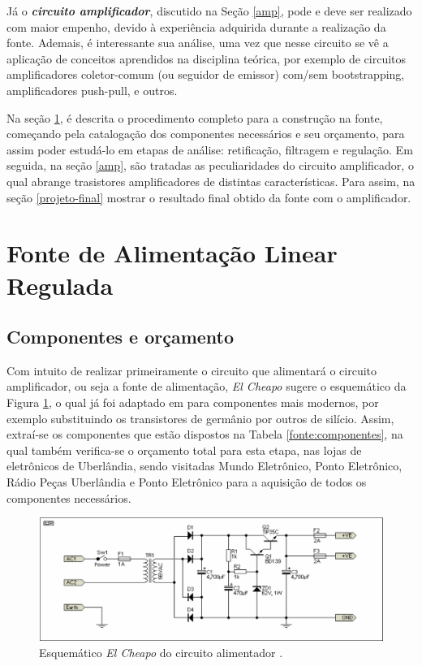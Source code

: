 \documentclass[a4paper,12pt,oneside,openany,table,xcdraw]{article}
\begin{document}
Já o \textbf{\textit{circuito amplificador}}, discutido na Seção \ref{amp}, pode e deve ser realizado com maior empenho, devido à experiência adquirida durante a realização da fonte. Ademais, é interessante sua análise, uma vez que nesse circuito se vê a aplicação de conceitos aprendidos na disciplina teórica, por exemplo de circuitos amplificadores coletor-comum (ou seguidor de emissor) com/sem bootstrapping, amplificadores push-pull, e outros.

Na seção \ref{fonte}, é descrita o procedimento completo para a construção na fonte, começando pela catalogação dos componentes necessários e seu orçamento, para assim poder estudá-lo em etapas de análise: retificação, filtragem e regulação. Em seguida, na seção \ref{amp}, são tratadas as peculiaridades do circuito amplificador, o qual abrange trasistores amplificadores de distintas características. Para assim, na seção \ref{projeto-final} mostrar o resultado final obtido da fonte com o amplificador.

\newpage
\section{Fonte de Alimentação Linear Regulada} \label{fonte}

\subsection{Componentes e orçamento} 
Com intuito de realizar primeiramente o circuito que alimentará o circuito amplificador, ou seja a fonte de alimentação, \emph{El Cheapo} sugere o esquemático da Figura \ref{fonte:esquematico}, o qual já foi adaptado em \cite{cheapo} para componentes mais modernos, por exemplo substituindo os transistores de germânio por outros de silício. Assim, extraí-se os componentes que estão dispostos na Tabela \ref{fonte:componentes}, na qual também verifica-se o orçamento total para esta etapa, nas lojas de eletrônicos de Uberlândia, sendo visitadas Mundo Eletrônico, Ponto Eletrônico, Rádio Peças Uberlândia e Ponto Eletrônico para a aquisição de todos os componentes necessários.
\vspace{0.2cm}

\begin{figure}[H]
\centering
\includegraphics[width=15cm]{fonte-esquematico}
\caption{Esquemático \emph{El Cheapo} do circuito alimentador \cite{cheapo}.}
\label{fonte:esquematico}
\end{figure}
\vspace{0.4cm}
\end{document}
